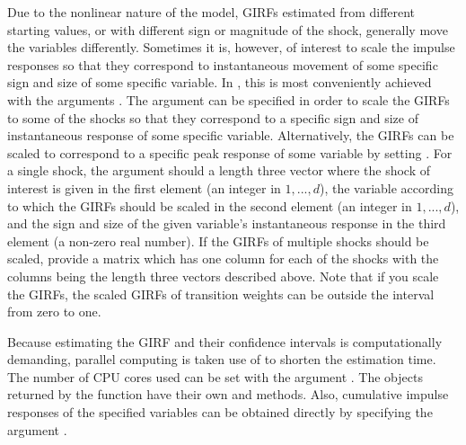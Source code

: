 \documentclass[nojss]{jss}
\begin{document}
Due to the nonlinear nature of the model, GIRFs estimated from different starting values, or with different sign or magnitude of the shock, generally move the variables differently. Sometimes it is, however, of interest to scale the impulse responses so that they correspond to instantaneous movement of some specific sign and size of some specific variable. In , this is most conveniently achieved with the arguments . The argument  can be specified in order to scale the GIRFs to some of the shocks so that they correspond to a specific sign and size of instantaneous response of some specific variable. Alternatively, the GIRFs can be scaled to correspond to a specific peak response of some variable by setting . For a single shock, the argument  should a length three vector where the shock of interest is given in the first element (an integer in $1,...,d$), the variable according to which the GIRFs should be scaled in the second element (an integer in $1,...,d$), and the sign and size of the given variable's instantaneous response in the third element (a non-zero real number). If the GIRFs of multiple shocks should be scaled, provide a matrix which has one column for each of the shocks with the columns being the length three vectors described above. Note that if you scale the GIRFs, the scaled GIRFs of transition weights can be outside the interval from zero to one.

Because estimating the GIRF and their confidence intervals is computationally demanding, parallel computing is taken use of to shorten the estimation time. The number of CPU cores used can be set with the argument . The objects returned by the  function have their own  and  methods. Also, cumulative impulse responses of the specified variables can be obtained directly by specifying the argument .
\end{document}

